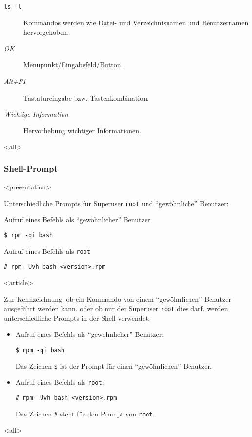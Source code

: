 \begin{frame}[fragile]
\begin{description}
\item[\texttt{ls -l}] Kommandos werden wie Datei- und Verzeichnisnamen und Benutzernamen hervorgehoben.

\item[\textit{OK}] Menüpunkt/Eingabefeld/Button.

\item[\textit{Alt+F1}] Tastatureingabe bzw. Tastenkombination.

\item[\emph{Wichtige Information}] Hervorhebung wichtiger Informationen.
\end{description}


\mode
<all>

\end{frame}
\newpage

\begin{frame}[fragile]
\frametitle<presentation>{Shell-Prompt}


\mode
<presentation>

Unterschiedliche Prompts für Superuser \texttt{root} und "`gewöhnliche"' Benutzer:

\begin{block}{Aufruf eines Befehls als "`gewöhnlicher"' Benutzer}
\begin{verbatim}
$ rpm -qi bash  
\end{verbatim}
  
\end{block}

\begin{block}{Aufruf eines Befehls als \texttt{root}}
\begin{verbatim}
# rpm -Uvh bash-<version>.rpm
\end{verbatim}
\end{block}

\mode
<article>

Zur Kennzeichnung, ob ein Kommando von einem "`gewöhnlichen"' Benutzer ausgeführt werden kann, oder ob nur der Superuser \texttt{root} dies darf, werden unterschiedliche Prompts in der Shell verwendet:

\begin{itemize}

\item Aufruf eines Befehls als "`gewöhnlicher"' Benutzer:
\begin{lstlisting}
$ rpm -qi bash
\end{lstlisting}
Das Zeichen \texttt{\$} ist der Prompt für einen "`gewöhnlichen"' Benutzer.

\item Aufruf eines Befehls als \texttt{root}:
\begin{lstlisting}
# rpm -Uvh bash-<version>.rpm
\end{lstlisting}
Das Zeichen \texttt{\#} steht für den Prompt von \texttt{root}.

\end{itemize}


\mode
<all>

\end{frame}
\newpage
\cleardoublepage
